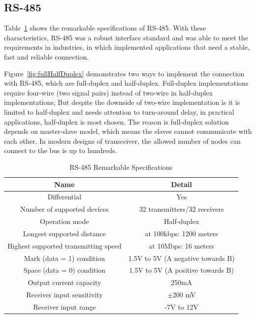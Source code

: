   
  \subsection{RS-485}
  Table~\ref{table:RS-485HighLightSpecs} shows the remarkable specifications of RS-485. With these characteristics, RS-485 was a robust interface standard and was able to meet the requirements in industries, in which implemented applications that need a stable, fast and reliable connection. 
  
  Figure~\ref{fig:fullHalfDuplex} demonstrates two ways to implement the connection with RS-485, which are full-duplex and half-duplex. Full-duplex implementations require four-wire (two signal pairs) instead of two-wire in half-duplex implementations; But despite the downside of two-wire implementation is it is limited to half-duplex and needs attention to turn-around delay, in practical applications, half-duplex is most chosen. The reason is full-duplex solution depends on master-slave model, which means the slaves cannot communicate with each other. In modern designs of transceiver, the allowed number of nodes can connect to the bus is up to hundreds.
    \begin{table}[h!]
      \begin{center}
      \begin{tabular}{ |c||c|  }
        \hline
        Name & Detail\\
        \hline
        Differential&   Yes\\
        Number of supported devices&   32 transmitters/32 receivers\\
        Operation mode & Half-duplex\\
        Longest supported distance & at 100kbps: 1200 meters\\
        Highest supported transmitting speed& at 10Mbps: 16 meters\\
        Mark (data = 1) condition& 1.5V to 5V (A negative towards B)\\
        Space (data = 0) condition& 1.5V to 5V (A positive towards B)\\
        Output current capacity& 250mA\\
        Receiver input sensitivity& $\pm$200 mV\\
        Receiver input range& -7V to 12V\\        
        \hline
       \end{tabular}
       \caption{RS-485 Remarkable Specifications}
       \label{table:RS-485HighLightSpecs}
      \end{center}
      \end{table}
    
